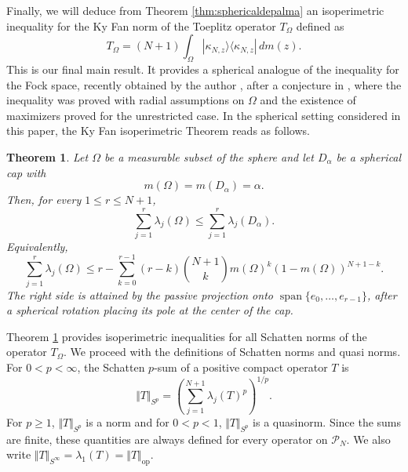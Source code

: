 \documentclass[12pt]{amsart}
\theoremstyle{plain}
\newtheorem{theorem}{Theorem}[section]
\theoremstyle{definition}
\theoremstyle{remark}
\numberwithin{equation}{section}
\newcommand{\func}[1]{\operatorname{#1}}
\newcommand{\1}{\mathbf 1}
\begin{document}
Finally, we will deduce from Theorem \ref{thm:sphericaldepalma} an
isoperimetric inequality for the Ky Fan norm of the Toeplitz operator $%
T_{\Omega }$ defined as 
\begin{equation*}
T_{\Omega }=(N+1)\int_{\Omega }|\kappa _{N,z}\rangle \langle \kappa
_{N,z}|\,dm(z)\text{.}
\end{equation*}%
This is our final main result. It provides a spherical analogue of the
inequality for the Fock space, recently obtained by the author \cite%
{AbreuKyFan}, after a conjecture in \cite%
{NicolaRiccardiTilli2025,NicolaRiccardiTilli2026}, where the inequality was
proved with radial assumptions on $\Omega $ and the existence of maximizers
proved for the unrestricted case. In the spherical setting considered in
this paper, the Ky Fan isoperimetric Theorem reads as follows.

\begin{theorem}
\label{thm:sphericalkyfan} Let $\Omega $ be a measurable subset of the
sphere and let $D_{\alpha }$ be a spherical cap with 
\begin{equation*}
m(\Omega )=m(D_{\alpha })=\alpha .
\end{equation*}%
Then, for every $1\leq r\leq N+1$, 
\begin{equation}
\sum_{j=1}^{r}\lambda _{j}(\Omega )\leq \sum_{j=1}^{r}\lambda _{j}(D_{\alpha
})\text{.}  \label{eq:kyfanmain}
\end{equation}%
Equivalently,%
\begin{equation*}
\sum_{j=1}^{r}\lambda _{j}(\Omega )\leq r-\sum_{k=0}^{r-1}(r-k)\binom{N+1}{k}%
m(\Omega )^{k}(1-m(\Omega ))^{N+1-k}\text{.}
\end{equation*}%
The right side is attained by the passive projection onto $\func{span}%
\{e_{0},\ldots ,e_{r-1}\}$, after a spherical rotation placing its pole at
the center of the cap.
\end{theorem}

Theorem \ref{thm:sphericalkyfan} provides isoperimetric inequalities for all
Schatten norms of the operator $T_{\Omega }$. We proceed with the
definitions of Schatten norms and quasi norms. For $0<p<\infty $, the
Schatten $p$-sum of a positive compact operator $T$ is 
\begin{equation*}
\Vert T\Vert _{S^{p}}=\left( \sum_{j=1}^{N+1}\lambda _{j}(T)^{p}\right)
^{1/p}.
\end{equation*}%
For $p\geq 1$, $\Vert T\Vert _{S^{p}}$ is a norm and for $0<p<1$, $\Vert
T\Vert _{S^{p}}$ is a quasinorm. Since the sums are finite, these quantities
are always defined for every operator on $\mathcal{P}_{N}$. We also write $%
\Vert T\Vert _{S^{\infty }}=\lambda _{1}(T)=\Vert T\Vert _{\mathrm{op}}.$
\end{document}
